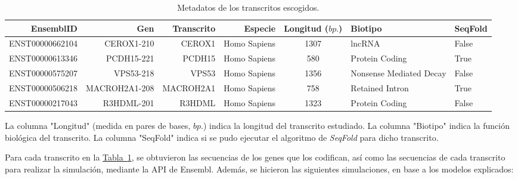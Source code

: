 \documentclass[a4paper,11pt,titlepage]{article}
\newcommand{\nr}[2][sección]{\hyperref[#2]{#1~\ref{#2}}}
\theoremstyle{definition}
\begin{document}
\begin{table}[H]
	\centering
    \begin{adjustbox}{width=\textwidth}
	\begin{tabular}{rrrrcll}
	    \toprule
        EnsemblID & Gen & Transcrito & Especie & Longitud ($bp.$) & Biotipo & SeqFold \\
		\midrule
        ENST00000662104 & CEROX1-210 & CEROX1 & Homo Sapiens & 1307 & lncRNA & False \\
        ENST00000613346 & PCDH15-221 & PCDH15 & Homo Sapiens & 580 & Protein Coding  & True \\
        ENST00000575207 & VPS53-218 & VPS53 & Homo Sapiens & 1356 & Nonsense Mediated Decay & False \\
        ENST00000506218 & MACROH2A1-208 & MACROH2A1 & Homo Sapiens & 758 & Retained Intron & True \\
        ENST00000217043 & R3HDML-201 & R3HDML & Homo Sapiens & 1323 & Protein Coding & False \\
		\bottomrule
	\end{tabular}
    \end{adjustbox}
	\caption{Metadatos de los transcritos escogidos.}
    \label{tab:transcripts}
\end{table}

La columna "Longitud" (medida en pares de bases, $bp.$) indica la longitud del transcrito estudiado. La columna "Biotipo" indica la función biológica del transcrito. La columna "SeqFold" indica si se pudo ejecutar el algoritmo de \textit{SeqFold} para dicho transcrito.

Para cada transcrito en la \nr[Tabla]{tab:transcripts}, se obtuvieron las secuencias de los genes que los codifican, así como las secuencias de cada transcrito para realizar la simulación, mediante la API de Ensembl. Además, se hicieron las siguientes simulaciones, en base a los modelos explicados: 
\end{document}
